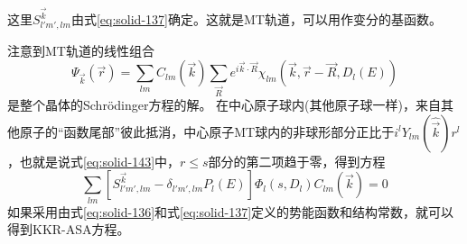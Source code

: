 这里$S_{l'm',lm}^{\vec k}$由式\eqref{eq:solid-137}确定。这就是MT轨道，可以用作变分的基函数。

注意到MT轨道的线性组合$$\Psi_{\vec k}(\vec r)=\sum_{lm}C_{lm}(\vec k)\sum_{\vec R}e^{i\vec k\cdot\vec R}\chi_{lm}(\vec k,\vec r-\vec R,D_l(E))$$是整个晶体的Schr\"odinger方程的解。%
在中心原子球内(其他原子球一样)，来自其他原子的“函数尾部”彼此抵消，中心原子MT球内的非球形部分正比于$i^lY_{lm}(\hat{\vec k})r^l$，也就是说式\eqref{eq:solid-143}中，$r\leqslant s$部分的第二项趋于零，得到方程%
\begin{equation}
  \sum_{lm}[S_{l'm',lm}^{\vec k}-\delta_{l'm',lm}P_l(E)]\Phi_l(s,D_l)C_{lm}(\vec k)=0
  \label{eq:solid-144}
\end{equation}
如果采用由式\eqref{eq:solid-136}和式\eqref{eq:solid-137}定义的势能函数和结构常数，就可以得到KKR-ASA方程。




